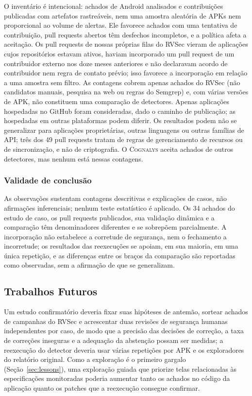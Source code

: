 \documentclass[conference]{IEEEtran}
\newcommand{\system}{\textsc{Cognalys}}
\begin{document}
O inventário é intencional: achados de Android analisados e contribuições
publicadas com artefatos rastreáveis, nem uma amostra aleatória de APKs nem
proporcional ao volume de alertas. Ele favorece achados com uma tentativa de
contribuição, pull requests abertos têm desfechos incompletos, e a política afeta a
aceitação. Os pull requests de nossas próprias filas do RVSec vieram de aplicações
cujos repositórios estavam ativos, haviam incorporado um pull request de um contribuidor
externo nos doze meses anteriores e não declaravam acordo de contribuidor nem regra de
contato prévio; isso favorece a incorporação em relação a uma amostra sem filtro. As contagens cobrem apenas achados do RVSec (não candidatos manuais, pesquisa
na web ou regras do Semgrep) e, com várias versões de APK, não constituem uma comparação
de detectores.
Apenas aplicações hospedadas no GitHub foram consideradas,
dado o caminho de publicação; as hospedadas em outras plataformas podem diferir. Os resultados podem não se generalizar para aplicações proprietárias, outras
linguagens ou outras famílias de API; três dos 49 pull requests tratam de
regras de gerenciamento de recursos ou de sincronização, e não de criptografia.
O \system{} aceita achados de outros detectores, mas nenhum está nessas contagens.

\subsubsection{Validade de conclusão}

As observações sustentam contagens descritivas e explicações de casos, não
afirmações inferenciais; nenhum teste estatístico é aplicado. Os 34 achados do
estudo de caso, os pull requests publicados, sua validação dinâmica e a
comparação têm denominadores diferentes e se sobrepõem parcialmente. A incorporação
não estabelece a corretude de segurança, nem o fechamento a incorretude; os resultados das
reexecuções se apoiam, em sua maioria, em uma única repetição, e as diferenças entre os braços
da comparação são reportadas como observadas, sem a afirmação de que se generalizam.

\subsection{Trabalhos Futuros}
\label{subsec:future}

Um estudo confirmatório deveria fixar suas hipóteses de antemão, sortear achados
de campanhas do RVSec e acrescentar duas revisões de segurança humanas independentes
por caso, de modo que a precisão das decisões de correção, a taxa de correções inseguras e
a adequação da abstenção possam ser medidas; a reexecução do detector deveria
usar várias repetições por APK e os exploradores do relatório original. Como
a exploração é o primeiro gargalo (Seção~\ref{sec:lessons}), uma exploração
guiada que priorize telas relacionadas às
especificações monitoradas poderia aumentar tanto os achados no código da aplicação quanto
os patches que a reexecução consegue confirmar.
\end{document}
